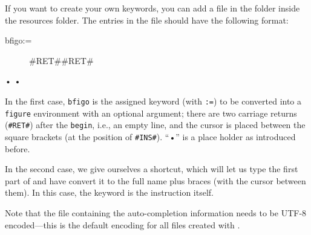 If you want to create your own keywords, you can add a  file in the  folder inside the resources folder. The entries in the file should have the following format:
\begin{verbExample}
bfigo:=\begin{figure}[#INS#]#RET##RET#\end{figure}•
•
\end{verbExample}

In the first case, \verb|bfigo| is the assigned keyword (with \verb|:=|) to be converted into a \verb|figure| environment with an optional argument; there are two carriage returns (\verb|#RET#|) after the \verb|begin|, i.e., an empty line, and the cursor is placed between the square brackets (at the position of \verb|#INS#|). ``•'' is a place holder as introduced before.

In the second case, we give ourselves a shortcut, which will let us type the first part of \verb|| and have {\Tw} convert it to the full name plus braces (with the cursor between them). In this case, the keyword is the instruction itself.

Note that the  file containing the auto-completion information needs to be UTF-8 encoded---this is the default encoding for all files created with {\Tw}.